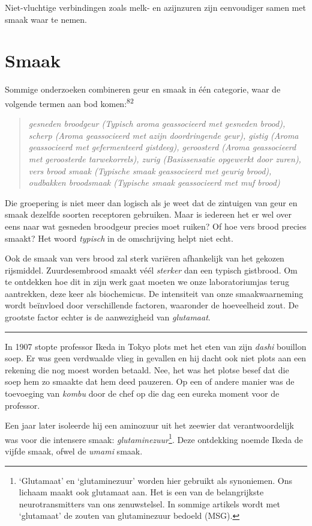 \documentclass[
  11pt,
  dutch,
]{memoir}
\begin{document}
Niet-vluchtige verbindingen zoals melk- en azijnzuren zijn eenvoudiger
samen met smaak waar te nemen.

\hypertarget{smaak}{%
\section{Smaak}\label{smaak}}

Sommige onderzoeken combineren geur en smaak in één categorie, waar de
volgende termen aan bod komen:\textsuperscript{82}

\begin{quote}
\emph{gesneden broodgeur (Typisch aroma geassocieerd met gesneden
brood), scherp (Aroma geassocieerd met azijn doordringende geur), gistig
(Aroma geassocieerd met gefermenteerd gistdeeg), geroosterd (Aroma
geassocieerd met geroosterde tarwekorrels), zurig (Basissensatie
opgewerkt door zuren), vers brood smaak (Typische smaak geassocieerd met
geurig brood), oudbakken broodsmaak (Typische smaak geassocieerd met muf
brood)}
\end{quote}

Die groepering is niet meer dan logisch als je weet dat de zintuigen van
geur en smaak dezelfde soorten receptoren gebruiken. Maar is iedereen
het er wel over eens naar wat gesneden broodgeur precies moet ruiken? Of
hoe vers brood precies smaakt? Het woord \emph{typisch} in de
omschrijving helpt niet echt.

Ook de smaak van vers brood zal sterk variëren afhankelijk van het
gekozen rijsmiddel. Zuurdesembrood smaakt véél \emph{sterker} dan een
typisch gistbrood. Om te ontdekken hoe dit in zijn werk gaat moeten we
onze laboratoriumjas terug aantrekken, deze keer als biochemicus. De
intensiteit van onze smaakwaarneming wordt beïnvloed door verschillende
factoren, waaronder de hoeveelheid zout. De grootste factor echter is de
aanwezigheid van \emph{glutamaat}.

\pfbreak

In 1907 stopte professor Ikeda in Tokyo plots met het eten van zijn
\emph{dashi} bouillon soep. Er was geen verdwaalde vlieg in gevallen en
hij dacht ook niet plots aan een rekening die nog moest worden betaald.
Nee, het was het plotse besef dat die soep hem zo smaakte dat hem deed
pauzeren. Op een of andere manier was de toevoeging van \emph{kombu}
door de chef op die dag een eureka moment voor de professor.

Een jaar later isoleerde hij een aminozuur uit het zeewier dat
verantwoordelijk was voor die intensere smaak:
\emph{glutaminezuur}\footnote{`Glutamaat' en `glutaminezuur' worden hier
  gebruikt als synoniemen. Ons lichaam maakt ook glutamaat aan. Het is
  een van de belangrijkste neurotransmitters van ons zenuwstelsel. In
  sommige artikels wordt met `glutamaat' de zouten van glutaminezuur
  bedoeld (MSG).}. Deze ontdekking noemde Ikeda de vijfde smaak, ofwel
de \emph{umami} smaak.
\end{document}
